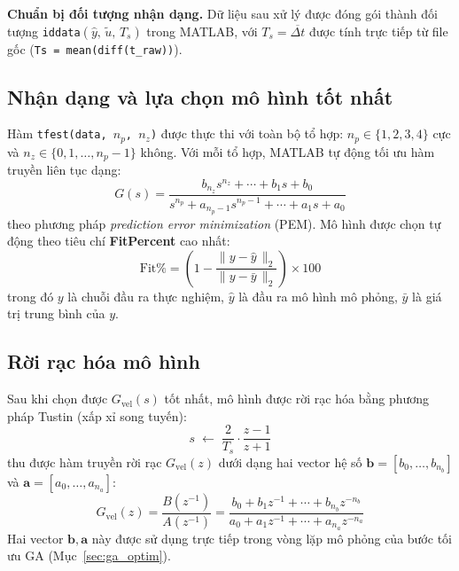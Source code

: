 \textbf{Chuẩn bị đối tượng nhận dạng.}
Dữ liệu sau xử lý được đóng gói thành đối tượng \texttt{iddata}$(\hat{y},\,\tilde{u},\,T_s)$
trong MATLAB, với $T_s = \overline{\Delta t}$ được tính trực tiếp từ file gốc
(\texttt{Ts = mean(diff(t\_raw))}).

\subsection{Nhận dạng và lựa chọn mô hình tốt nhất}

Hàm \texttt{tfest(data, $n_p$, $n_z$)} được thực thi với toàn bộ tổ hợp:
$n_p \in \{1,2,3,4\}$ cực và $n_z \in \{0,1,\ldots,n_p{-}1\}$ không.
Với mỗi tổ hợp, MATLAB tự động tối ưu hàm truyền liên tục dạng:
\begin{equation}
    G(s) = \frac{b_{n_z}s^{n_z} + \cdots + b_1 s + b_0}
                {s^{n_p} + a_{n_p-1}s^{n_p-1} + \cdots + a_1 s + a_0}
    \label{eq:Gs_form}
\end{equation}
theo phương pháp \textit{prediction error minimization} (PEM). Mô hình được
chọn tự động theo tiêu chí \textbf{FitPercent} cao nhất:
\begin{equation}
    \text{Fit\%} =
    \left(1 - \frac{\lVert y - \hat{y}\,\rVert_2}
                   {\lVert y - \bar{y}\,\rVert_2}\right) \times 100
    \label{eq:fit_pct}
\end{equation}
trong đó $y$ là chuỗi đầu ra thực nghiệm, $\hat{y}$ là đầu ra mô hình mô
phỏng, $\bar{y}$ là giá trị trung bình của $y$.

\subsection{Rời rạc hóa mô hình}

Sau khi chọn được $G_{\text{vel}}(s)$ tốt nhất, mô hình được rời rạc hóa
bằng phương pháp Tustin (xấp xỉ song tuyến):
\begin{equation}
    s \;\longleftarrow\; \frac{2}{T_s}\cdot\frac{z-1}{z+1}
    \label{eq:tustin}
\end{equation}
thu được hàm truyền rời rạc $G_{\text{vel}}(z)$ dưới dạng hai vector hệ số
$\mathbf{b} = [b_0,\ldots,b_{n_b}]$ và $\mathbf{a} = [a_0,\ldots,a_{n_a}]$:
\begin{equation}
    G_{\text{vel}}(z) = \frac{B(z^{-1})}{A(z^{-1})}
    = \frac{b_0 + b_1 z^{-1} + \cdots + b_{n_b} z^{-n_b}}
           {a_0 + a_1 z^{-1} + \cdots + a_{n_a} z^{-n_a}}
    \label{eq:Gz_form}
\end{equation}
Hai vector $\mathbf{b},\mathbf{a}$ này được sử dụng trực tiếp trong vòng lặp
mô phỏng của bước tối ưu GA (Mục~\ref{sec:ga_optim}).


